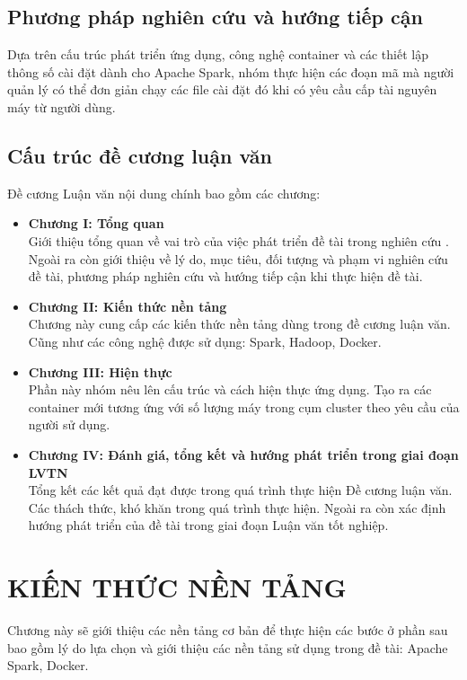 \documentclass[11pt,a4paper]{article}
\begin{document}
\subsection{Phương pháp nghiên cứu và hướng tiếp cận}
Dựa trên cấu trúc phát triển ứng dụng, công nghệ container và các thiết lập thông số cài đặt dành cho Apache Spark, nhóm thực hiện các đoạn mã mà người quản lý có thể đơn giản chạy các file cài đặt đó khi có yêu cầu cấp tài nguyên máy từ người dùng.

\subsection{Cấu trúc đề cương luận văn}
Đề cương Luận văn nội dung chính bao gồm các chương:
\begin{itemize}
    \item \textbf{Chương I: Tổng quan}\\
    Giới thiệu tổng quan về vai trò của việc phát triển đề tài trong nghiên cứu . Ngoài ra còn giới thiệu về lý do, mục tiêu, đối tượng và phạm vi nghiên cứu đề tài, phương pháp nghiên cứu và hướng tiếp cận khi thực hiện đề tài.
    \item \textbf{Chương II: Kiến thức nền tảng}\\
    Chương này cung cấp các kiến thức nền tảng dùng trong đề cương luận văn. Cũng như các công nghệ được sử dụng: Spark, Hadoop, Docker.
    \item \textbf{Chương III: Hiện thực}\\
    Phần này nhóm nêu lên cấu trúc và cách hiện thực ứng dụng. Tạo ra các container mới tương ứng với số lượng máy trong cụm cluster theo yêu cầu của người sử dụng.
    \item \textbf{Chương IV: Đánh giá, tổng kết và hướng phát triển trong giai đoạn LVTN}\\
    Tổng kết các kết quả đạt được trong quá trình thực hiện Đề cương luận văn. Các thách thức, khó khăn trong quá trình thực hiện. Ngoài ra còn xác định hướng phát triển của đề tài trong giai đoạn Luận văn tốt nghiệp.
\end{itemize}


\newpage
\section{KIẾN THỨC NỀN TẢNG}
Chương này sẽ giới thiệu các nền tảng cơ bản để thực hiện các bước ở phần sau bao gồm lý do lựa chọn và giới thiệu các nền tảng sử dụng trong đề tài: Apache Spark, Docker.
\end{document}
